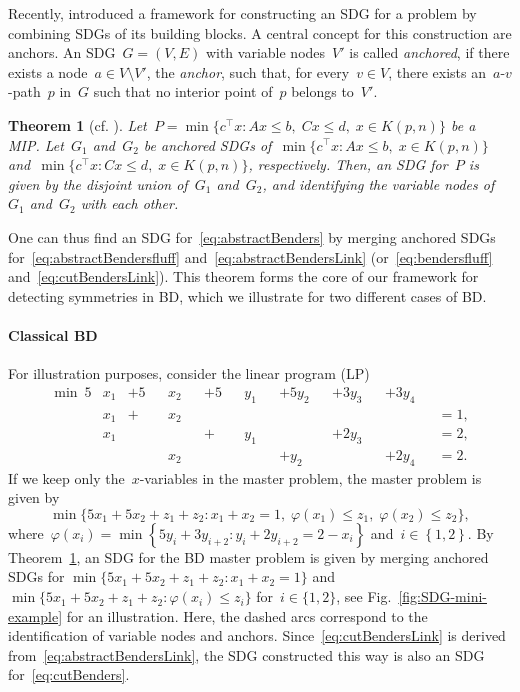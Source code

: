 \documentclass[a4paper,10pt]{article}
\newcommand{\sprod}[2]{#1^\top #2}
\newcommand{\brackets}[1]{\left\{ #1 \right\}}
\newtheorem{theorem}{Theorem}
\theoremstyle{definition}
\begin{document}
Recently, \cite{hojny2025detecting} introduced a framework for constructing an SDG for a problem by combining SDGs of its building blocks.
A central concept for this construction are anchors.
An SDG~$G = (V,E)$ with variable nodes~$V'$ is called \emph{anchored}, if there exists a node~$a \in V \setminus V'$, the \emph{anchor}, such that, for every~$v \in V$, there exists an~$a$-$v$-path~$p$ in~$G$ such that no interior point of~$p$ belongs to~$V'$.
%
\begin{theorem}[cf. \cite{hojny2025detecting}]
  \label{thm:merge-SDGs}
  Let~$P = \min\{\sprod{c}{x} : Ax \leq b,\; Cx \leq d,\; x \in K(p,n)\}$ be a MIP.
  Let~$G_1$ and~$G_2$ be anchored SDGs of~$\min\{\sprod{c}{x} : Ax \leq b,\; x \in K(p,n)\}$ and~$\min\{\sprod{c}{x} : Cx \leq d,\; x \in K(p,n)\}$, respectively.
  Then, an SDG for~$P$ is given by the disjoint union of~$G_1$ and~$G_2$, and identifying the variable nodes of~$G_1$ and~$G_2$ with each other.
\end{theorem}
One can thus find an SDG for~\eqref{eq:abstractBenders} by merging anchored SDGs for~\eqref{eq:abstractBendersfluff} and~\eqref{eq:abstractBendersLink} (or~\eqref{eq:bendersfluff} and~\eqref{eq:cutBendersLink}).
This theorem forms the core of our framework for detecting symmetries in BD, which we illustrate for two different cases of BD.

\paragraph{Classical BD}
For illustration purposes, consider the linear program (LP)
\begin{subequations}
  \label{eq:trivial-example}
  \begin{alignat}{10}
    \min\       5&x_1  &+5&&x_2 &&+5&&y_1 &&+5y_2 &&+ 3y_3 &&+ 3y_4 \nonumber\\
                 &x_1  &+ &&x_2 &&  &&    &&      &&       &&       &&= 1,\\
                 &x_1  &  &&    &&+ &&y_1 &&      &&+ 2y_3 &&       &&= 2,\\
                 &     &  &&x_2 &&  &&    &&+ y_2 &&       &&+ 2y_4 &&= 2.
  \end{alignat}
\end{subequations}
If we keep only the~$x$-variables in the master problem, the master problem is given by
\begin{equation*}
  \min\{5x_1 + 5x_2 + z_1 + z_2 : x_1 + x_2 = 1,\; \varphi(x_1) \leq z_1,\; \varphi(x_2) \leq z_2\},
\end{equation*}
where~$\varphi(x_i) =\min\brackets{5y_i + 3y_{i+2} : y_i + 2 y_{i+2} = 2 - x_i}$ and~$i\in\brackets{1,2}$.
By Theorem~\ref{thm:merge-SDGs}, an SDG for the BD master problem is given by merging anchored SDGs for $\min\{5x_1+5x_2 + z_1 + z_2 : x_1 + x_2 = 1\}$ and~$\min\{5x_1 + 5x_2 + z_1 + z_2 : \varphi(x_i) \leq z_i\}$ for~$i \in \{1,2\}$, see Fig.~\ref{fig:SDG-mini-example} for an illustration.
Here, the dashed arcs correspond to the identification of variable nodes and anchors.
Since~\eqref{eq:cutBendersLink} is derived from~\eqref{eq:abstractBendersLink}, the SDG constructed this way is also an SDG for~\eqref{eq:cutBenders}.
\end{document}
